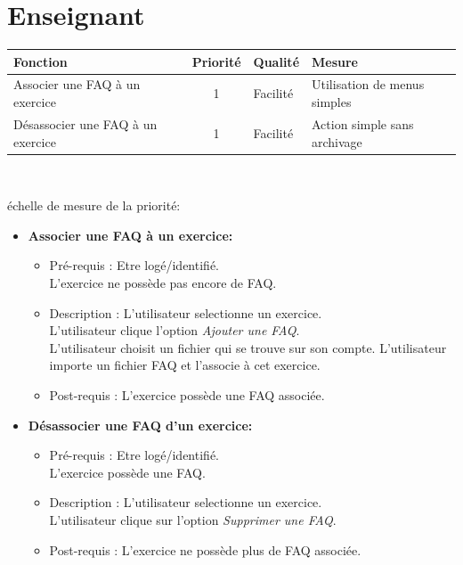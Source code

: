 \section*{Enseignant}



\begin{tabular}{|p{4cm}|c|p{4cm}|p{5cm}|}
\hline
Fonction & Priorit{\'e} & Qualit{\'e} & Mesure \\
\hline
Associer une FAQ {\`a} un exercice & 1 & Facilit{\'e} & Utilisation de menus simples\\
\hline
D{\'e}sassocier une FAQ {\`a} un exercice & 1 & Facilit{\'e} & Action simple sans archivage\\
\hline
\end{tabular}\\

\begin{center}
{\'e}chelle de mesure de la priorit{\'e}:

\end{center}

\begin{itemize}
\item {\bf Associer une FAQ {\`a} un exercice:}
	\begin{itemize}
	\item Pr{\'e}-requis : Etre log{\'e}/identifi{\'e}.\\
	L'exercice ne poss{\`e}de pas encore de FAQ.
	\item Description :  L'utilisateur selectionne un exercice.\\
	L'utilisateur clique l'option {\it Ajouter une FAQ}.\\
	L'utilisateur choisit un fichier qui se trouve sur son compte.
	L'utilisateur importe un fichier FAQ et l'associe {\`a} cet exercice.
	\item Post-requis : L'exercice poss{\`e}de une FAQ associ{\'e}e.
	\end{itemize}

\item {\bf D{\'e}sassocier une FAQ d'un exercice:}
	\begin{itemize}
	\item Pr{\'e}-requis : Etre log{\'e}/identifi{\'e}.\\
	L'exercice poss{\`e}de une FAQ.
	\item Description :  L'utilisateur selectionne un exercice.\\
	L'utilisateur clique sur l'option {\it Supprimer une FAQ}.
	\item Post-requis : L'exercice ne poss{\`e}de plus de FAQ associ{\'e}e.\\
	\end{itemize}
\end{itemize}


